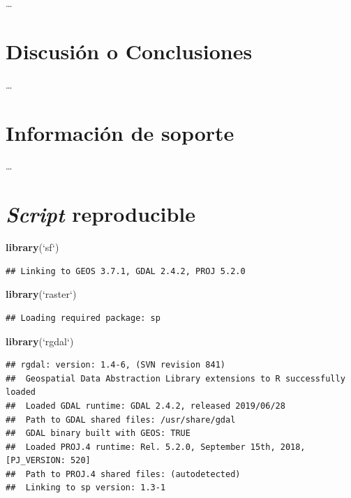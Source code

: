 \documentclass[11pt,]{article}
\newenvironment{Shaded}{\begin{snugshade}}{\end{snugshade}}
\newcommand{\KeywordTok}[1]{\textcolor[rgb]{0.13,0.29,0.53}{\textbf{#1}}}
\newcommand{\DataTypeTok}[1]{\textcolor[rgb]{0.13,0.29,0.53}{#1}}
\newcommand{\StringTok}[1]{\textcolor[rgb]{0.31,0.60,0.02}{#1}}
\newcommand{\NormalTok}[1]{#1}
\begin{document}
\ldots

\section{Discusión o Conclusiones}\label{discusiuxf3n-o-conclusiones}

\ldots

\section{Información de soporte}\label{informaciuxf3n-de-soporte}

\ldots

\section{\texorpdfstring{\emph{Script}
reproducible}{Script reproducible}}\label{script-reproducible}

\begin{Shaded}
\begin{Highlighting}[]
\KeywordTok{library}\NormalTok{(}\StringTok{`}\DataTypeTok{sf}\StringTok{`}\NormalTok{)}
\end{Highlighting}
\end{Shaded}

\begin{verbatim}
## Linking to GEOS 3.7.1, GDAL 2.4.2, PROJ 5.2.0
\end{verbatim}

\begin{Shaded}
\begin{Highlighting}[]
\KeywordTok{library}\NormalTok{(}\StringTok{`}\DataTypeTok{raster}\StringTok{`}\NormalTok{)}
\end{Highlighting}
\end{Shaded}

\begin{verbatim}
## Loading required package: sp
\end{verbatim}

\begin{Shaded}
\begin{Highlighting}[]
\KeywordTok{library}\NormalTok{(}\StringTok{`}\DataTypeTok{rgdal}\StringTok{`}\NormalTok{)}
\end{Highlighting}
\end{Shaded}

\begin{verbatim}
## rgdal: version: 1.4-6, (SVN revision 841)
##  Geospatial Data Abstraction Library extensions to R successfully loaded
##  Loaded GDAL runtime: GDAL 2.4.2, released 2019/06/28
##  Path to GDAL shared files: /usr/share/gdal
##  GDAL binary built with GEOS: TRUE 
##  Loaded PROJ.4 runtime: Rel. 5.2.0, September 15th, 2018, [PJ_VERSION: 520]
##  Path to PROJ.4 shared files: (autodetected)
##  Linking to sp version: 1.3-1
\end{verbatim}
\end{document}
